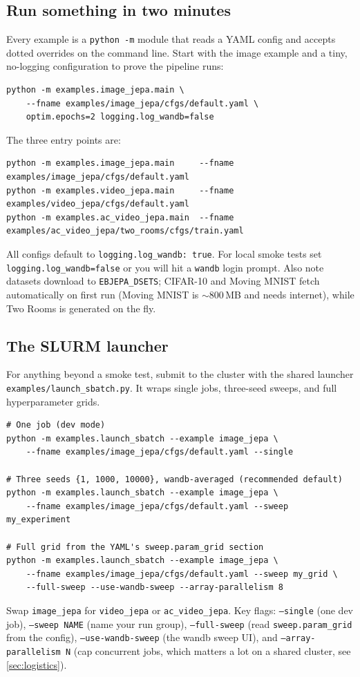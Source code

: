 \documentclass{article}
\newcommand{\code}[1]{\texttt{\small #1}}
\newcommand{\file}[1]{\texttt{\small #1}}
\begin{document}
\subsection{Run something in two minutes}

Every example is a \code{python -m} module that reads a YAML config and accepts
dotted overrides on the command line. Start with the image example and a tiny,
no-logging configuration to prove the pipeline runs:
\begin{lstlisting}[style=bash]
python -m examples.image_jepa.main \
    --fname examples/image_jepa/cfgs/default.yaml \
    optim.epochs=2 logging.log_wandb=false
\end{lstlisting}
The three entry points are:
\begin{lstlisting}[style=bash]
python -m examples.image_jepa.main     --fname examples/image_jepa/cfgs/default.yaml
python -m examples.video_jepa.main     --fname examples/video_jepa/cfgs/default.yaml
python -m examples.ac_video_jepa.main  --fname examples/ac_video_jepa/two_rooms/cfgs/train.yaml
\end{lstlisting}

\begin{gotchabox}
All configs default to \code{logging.log\_wandb: true}. For local smoke tests set
\code{logging.log\_wandb=false} or you will hit a \code{wandb} login prompt. Also
note datasets download to \code{EBJEPA\_DSETS}; CIFAR-10 and Moving MNIST fetch
automatically on first run (Moving MNIST is $\sim$800\,MB and needs internet),
while Two Rooms is generated on the fly.
\end{gotchabox}

\subsection{The SLURM launcher}

For anything beyond a smoke test, submit to the cluster with the shared launcher
\file{examples/launch\_sbatch.py}. It wraps single jobs, three-seed sweeps, and
full hyperparameter grids.
\begin{lstlisting}[style=bash]
# One job (dev mode)
python -m examples.launch_sbatch --example image_jepa \
    --fname examples/image_jepa/cfgs/default.yaml --single

# Three seeds {1, 1000, 10000}, wandb-averaged (recommended default)
python -m examples.launch_sbatch --example image_jepa \
    --fname examples/image_jepa/cfgs/default.yaml --sweep my_experiment

# Full grid from the YAML's sweep.param_grid section
python -m examples.launch_sbatch --example image_jepa \
    --fname examples/image_jepa/cfgs/default.yaml --sweep my_grid \
    --full-sweep --use-wandb-sweep --array-parallelism 8
\end{lstlisting}
Swap \code{image\_jepa} for \code{video\_jepa} or \code{ac\_video\_jepa}. Key
flags: \code{--single} (one dev job), \code{--sweep NAME} (name your run group),
\code{--full-sweep} (read \code{sweep.param\_grid} from the config),
\code{--use-wandb-sweep} (the wandb sweep UI), and \code{--array-parallelism N}
(cap concurrent jobs, which matters a lot on a shared cluster, see
\cref{sec:logistics}).
\end{document}
